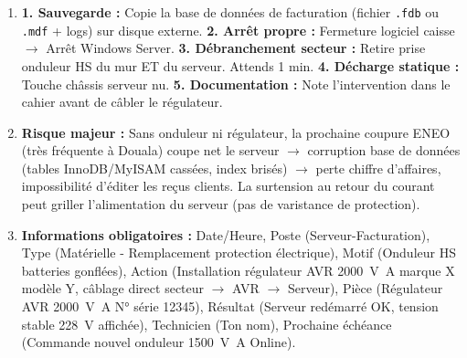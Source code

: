 \documentclass[11pt]{article}
\begin{document}
\begin{corrige}
\begin{enumerate}
    \item \textbf{1. Sauvegarde :} Copie la base de données de facturation (fichier \texttt{.fdb} ou \texttt{.mdf} + logs) sur disque externe. \textbf{2. Arrêt propre :} Fermeture logiciel caisse $\rightarrow$ Arrêt Windows Server. \textbf{3. Débranchement secteur :} Retire prise onduleur HS du mur ET du serveur. Attends 1 min. \textbf{4. Décharge statique :} Touche châssis serveur nu. \textbf{5. Documentation :} Note l'intervention dans le cahier avant de câbler le régulateur.
    \item \textbf{Risque majeur :} Sans onduleur ni régulateur, la prochaine coupure ENEO (très fréquente à Douala) coupe net le serveur $\rightarrow$ corruption base de données (tables InnoDB/MyISAM cassées, index brisés) $\rightarrow$ perte chiffre d'affaires, impossibilité d'éditer les reçus clients. La surtension au retour du courant peut griller l'alimentation du serveur (pas de varistance de protection).
    \item \textbf{Informations obligatoires :} Date/Heure, Poste (Serveur-Facturation), Type (Matérielle - Remplacement protection électrique), Motif (Onduleur HS batteries gonflées), Action (Installation régulateur AVR \SI{2000}{\volt\ampere} marque X modèle Y, câblage direct secteur $\rightarrow$ AVR $\rightarrow$ Serveur), Pièce (Régulateur AVR \SI{2000}{\volt\ampere} N° série 12345), Résultat (Serveur redémarré OK, tension stable \SI{228}{\volt} affichée), Technicien (Ton nom), Prochaine échéance (Commande nouvel onduleur \SI{1500}{\volt\ampere} Online).
\end{enumerate}
\end{corrige}
\end{document}
